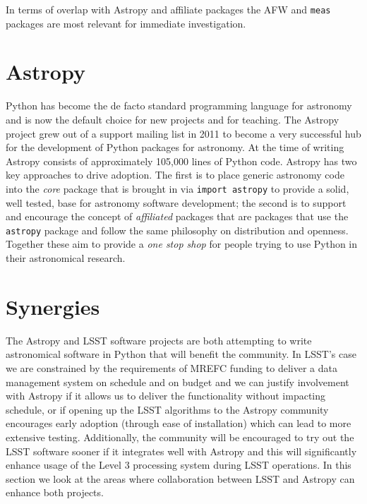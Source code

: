 \documentclass[]{spie}  %
\begin{document}
In terms of overlap with Astropy and affiliate packages the AFW and \texttt{meas} packages are most relevant for immediate investigation.


\section{Astropy}

Python has become the de facto standard programming language for astronomy\cite{2000ASPC..216...59G,2006ASPC..351..343H,2006ASPC..351..497K,2011ASPC..442..425G,2012SPIE.8451E..02J} and is now the default choice for new projects and for teaching.
The Astropy\cite{2013A&A...558A..33A} project grew out of a support mailing list in 2011 to become a very successful hub for the development of Python packages for astronomy.
At the time of writing Astropy consists of approximately 105,000 lines of Python code.
Astropy has two key approaches to drive adoption.
The first is to place generic astronomy code into the \emph{core} package that is brought in via \texttt{import astropy} to provide a solid, well tested, base for astronomy software development; the second is to support and encourage the concept of \emph{affiliated} packages that are packages that use the \texttt{astropy} package and follow the same philosophy on distribution and openness.
Together these aim to provide a \emph{one stop shop} for people trying to use Python in their astronomical research.

\section{Synergies}

The Astropy and LSST software projects are both attempting to write astronomical software in Python that will benefit the community.
In LSST's case we are constrained by the requirements of MREFC funding to deliver a data management system on schedule and on budget and we can justify involvement with Astropy if it allows us to deliver the functionality without impacting schedule, or if opening up the LSST algorithms to the Astropy community encourages early adoption (through ease of installation) which can lead to more extensive testing.
Additionally, the community will be encouraged to try out the LSST software sooner if it integrates well with Astropy and this will significantly enhance usage of the Level 3 processing system during LSST operations.
In this section we look at the areas where collaboration between LSST and Astropy can enhance both projects.
\end{document}
